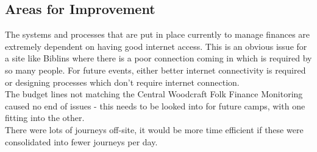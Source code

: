 \subsection{Areas for Improvement}
The systems and processes that are put in place currently to manage finances are extremely dependent on having good internet access. This is an obvious issue for a site like Biblins where there is a poor connection coming in which is required by so many people. For future events, either better internet connectivity is required or designing processes which don't require internet connection. \\

The budget lines not matching the Central Woodcraft Folk Finance Monitoring caused no end of issues - this needs to be looked into for future camps, with one fitting into the other.\\

There were lots of journeys off-site, it would be more time efficient if these were consolidated into fewer journeys per day. 
